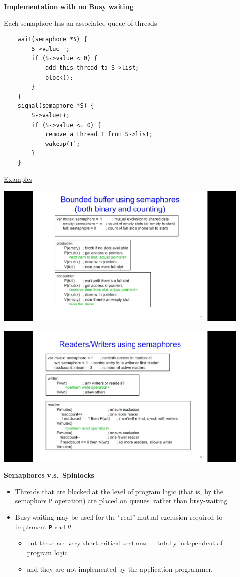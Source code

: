 \documentclass[11pt,a4paper]{article}
\begin{document}
\textbf{Implementation with no Busy waiting}

Each semaphore has an associated queue of threads
\begin{verbatim}
    wait(semaphore *S) {
        S->value--;
        if (S->value < 0) {
            add this thread to S->list;
            block();
        }
    }
    signal(semaphore *S) {
        S->value++;
        if (S->value <= 0) {
            remove a thread T from S->list;
            wakeup(T);
        }
    }
\end{verbatim}

\underline{Examples}

\includegraphics[height=270]{bounded-buffer-using-semaphores.jpg}

\includegraphics[height=270]{readers-writers-using-semaphores.jpg}

\textbf{Semaphores v.s.\ Spinlocks}
\begin{itemize}
    \item Threads that are blocked at the level of program logic
        (that is, by the semaphore \texttt{P} operation)
        are placed on queues, rather than busy-waiting.
    \item Busy-waiting may be used for the ``real'' mutual exclusion required to implement
        \texttt{P} and \texttt{V}
        \begin{itemize}
            \item but these are very short critical sections ---
                totally independent of program logic
            \item and they are not implemented by the application programmer.
        \end{itemize}
\end{itemize}
\end{document}
